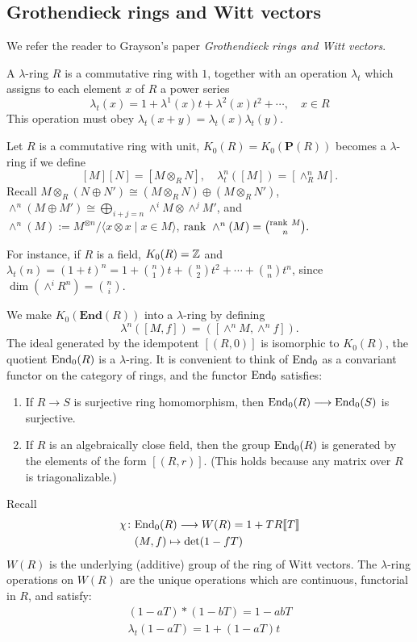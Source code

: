 \subsection{Grothendieck rings and Witt vectors}
\label{subsec:grothendieck_rings_and_witt_vectors}
We refer the reader to Grayson's paper {\em Grothendieck rings and Witt vectors}.
\begin{definition}
	A $\lambda$-ring $R$ is a commutative  ring with $1$, together with an operation $\lambda_t$ which assigns to each element $x$ of $R$ a power series
	\[\lambda_t(x)=1+\lambda^1(x)t+\lambda^2(x)t^2+\cdots, \quad x\in R\]
	This operation must obey $\lambda_t(x+y)=\lambda_t(x)\lambda_t(y)$. 
\end{definition}
Let $R$ is a commutative ring with unit, $K_0(R)=K_0(\mathbf{P}(R))$ becomes a $\lambda$-ring if we define 
\[ [M][N]=[M\otimes_R N], \quad \lambda_t^n([M])=[\wedge^n_R M]. \]
Recall $M\otimes_R(N\oplus N')\cong (M\otimes_R N)\oplus(M\otimes_R N')$, $\wedge^n(M\oplus M')\cong \bigoplus_{i+j=n}\wedge^i M\otimes \wedge^j M'$, and $\wedge^n(M):=M^{\otimes n}/\langle x\otimes x \mid x\in M\rangle$, $\mathrm{rank\ } \wedge^n(M)=\binom{\mathrm{rank\ } M}{n}. $

For instance, if $R$ is a field, $K_0(R)=\mathbb{Z}$ and $\lambda_t(n)=(1+t)^n=1+\binom{n}{1}t+\binom{n}{2}t^2+\cdots+\binom{n}{n}t^n$, since $\dim (\wedge^i R^n)=\binom{n}{i}$.

We make $K_0(\mathbf{End}(R))$ into a $\lambda$-ring by defining
\[\lambda^n([M, f])=([\wedge^n M,\wedge^n f]).\]
The ideal generated by the idempotent $[(R,0)]$ is isomorphic to $K_0(R)$, the quotient $\mathrm{End}_0(R)$ is a $\lambda$-ring. It is convenient to think of $\mathrm{End}_0$ as a convariant functor on the category of rings, and the functor $\mathrm{End}_0$ satisfies:
\begin{enumerate}
	\item If $R\longrightarrow S$ is surjective ring homomorphism, then $\mathrm{End}_0(R)\longrightarrow \mathrm{End}_0(S)$ is surjective.
	\item If $R$ is an algebraically close field, then the group $\mathrm{End}_0(R)$ is generated by the elements of the form $[(R,r)]$. (This holds because any matrix over $R$ is triagonalizable.)
\end{enumerate}

Recall 
\begin{align*}
	\chi \colon&  \mathrm{End}_0(R)\longrightarrow W(R)=1+TR\llbracket T\rrbracket \\
     & (M,f) \mapsto \det(1-fT)
\end{align*}
$W(R)$ is the underlying (additive) group of the ring of Witt vectors. The $\lambda$-ring operations on $W(R)$ are the unique operations which are continuous, functorial in $R$, and satisfy:
\begin{gather*}
	(1-aT)*(1-bT)=1-abT\\
	\lambda_t(1-aT)=1+(1-aT)t
\end{gather*}

